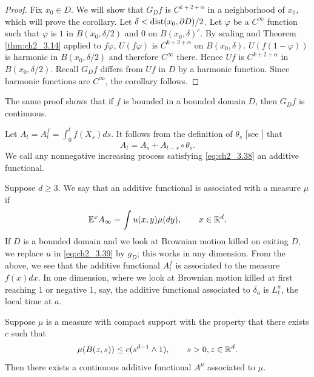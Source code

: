 \begin{proof}
Fix $x_0 \in D$. We will show that $G_Df$ is $C^{k+2+\alpha}$ in a neighborhood of $x_0$, which will prove the corollary. Let $\delta < \operatorname{dist}(x_0,\partial D)/2$. Let $\varphi$ be a $C^\infty$ function such that $\varphi$ is $1$ in $B(x_0,\delta/2)$ and $0$ on $B(x_0,\delta)^c$. By scaling and Theorem \ref{thm:ch2_3.14} applied to $f\varphi$, $U(f\varphi)$ is $C^{k+2+\alpha}$ on $B(x_0,\delta)$. $U(f(1-\varphi))$ is harmonic in $B(x_0,\delta/2)$ and therefore $C^\infty$ there. Hence $Uf$ is $C^{k+2+\alpha}$ in $B(x_0,\delta/2)$. Recall $G_Df$ differs from $Uf$ in $D$ by a harmonic function. Since harmonic functions are $C^\infty$, the corollary follows.
\end{proof}

The same proof shows that if $f$ is bounded in a bounded domain $D$, then $G_Df$ is continuous.



Let $A_t = A_t^f = \int_0^t f(X_s)ds$. It follows from the definition of $\theta_s$ [see ] that
\begin{equation}\label{eq:ch2_3.38}
    A_t = A_s + A_{t-s} \circ \theta_s.
\end{equation}
We call any nonnegative increasing process satisfying \eqref{eq:ch2_3.38} an additive functional.

Suppose $d \geq 3$. We say that an additive functional is associated with a measure $\mu$ if
\begin{equation}\label{eq:ch2_3.39}
    \mathbb{E}^xA_\infty = \int u(x,y)\mu(dy), \qquad x \in \mathbb{R}^d.
\end{equation}
If $D$ is a bounded domain and we look at Brownian motion killed on exiting $D$, we replace $u$ in \eqref{eq:ch2_3.39} by $g_D$; this works in any dimension. From the above, we see that the additive functional $A_t^f$ is associated to the measure $f(x)dx$. In one dimension, where we look at Brownian motion killed at first reaching $1$ or negative $1$, say, the additive functional associated to $\delta_a$ is $L_t^a$, the local time at $a$.

\begin{theorem}\label{thm:ch2_3.16}
Suppose $\mu$ is a measure with compact support with the property that there exists $c$ such that
\begin{equation}\label{eq:ch2_3.40}
    \mu(B(z,s)) \leq c(s^{d-1} \wedge 1), \qquad s > 0, z \in \mathbb{R}^d.
\end{equation}
Then there exists a continuous additive functional $A^\mu$ associated to $\mu$.
\end{theorem}

